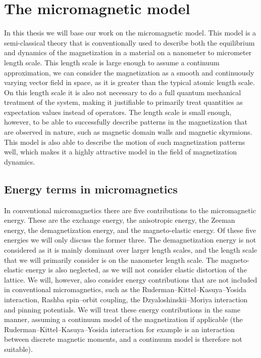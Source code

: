 \chapter{The micromagnetic model}
In this thesis we will base our work on the micromagnetic model. This model is a semi-classical theory that is conventionally used to describe both the equilibrium and dynamics of the magnetization in a material on a nanometer to micrometer length scale. This length scale is large enough to assume a continuum approximation, we can consider the magnetization as a smooth and continuously varying vector field in space, as it is greater than the typical atomic length scale. On this length scale it is also not necessary to do a full quantum mechanical treatment of the system, making it justifiable to primarily treat quantities as expectation values instead of operators. The length scale is small enough, however, to be able to successfully describe patterns in the magnetization that are observed in nature, such as magnetic domain walls and magnetic skyrmions. This model is also able to describe the motion of such magnetization patterns well, which makes it a highly attractive model in the field of magnetization dynamics.
\section{Energy terms in micromagnetics}
In conventional micromagnetics there are five contributions to the micromagnetic energy. These are the exchange energy, the anisotropic energy, the Zeeman energy, the demagnetization energy, and the magneto-elastic energy. Of these five energies we will only discuss the former three. The demagnetization energy is not considered as it is mainly dominant over larger length scales, and the length scale that we will primarily consider is on the nanometer length scale. The magneto-elastic energy is also neglected, as we will not consider elastic distortion of the lattice. We will, however, also consider energy contributions that are not included in conventional micromagnetics, such as the Ruderman--Kittel--Kasuya--Yosida interaction, Rashba spin--orbit coupling, the Dzyaloshinskii--Moriya interaction and pinning potentials. We will treat these energy contributions in the same manner, assuming a continuum model of the magnetization if applicable (the Ruderman--Kittel--Kasuya--Yosida interaction for example is an interaction between discrete magnetic moments, and a continuum model is therefore not suitable).
